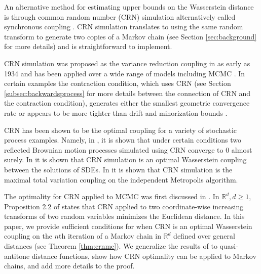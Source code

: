 \documentclass[12pt]{article}
\theoremstyle{plain}%
\theoremstyle{definition}
\begin{document}
An alternative method for estimating upper bounds on the Wasserstein distance is through common random number (CRN) simulation \cite{crn, jacob, sixtacrn} alternatively called synchronous coupling \cite{sdesynch,browniansynch, jacob}. CRN simulation translates to using the same random transform to generate two copies of a Markov chain (see Section \ref{sec:background} for more details) and is straightforward to implement. 

CRN simulation was proposed as the variance reduction coupling in as early as 1934 \cite{inequalities} and has been applied over a wide range of models including MCMC \cite{sixtacrn, biswas, crnconv}. In certain examples the contraction condition, which uses CRN (see Section \ref{subsec:backwardsprocess} for more details between the connection of CRN and the contraction condition), generates either the smallest geometric convergence rate \cite{oneshotnsphereexample, sixta,raj} or appears to be more tighter than drift and minorization bounds \cite{sixtacrn, jiangoneshotnsphereexample}.  



CRN has been shown to be the optimal coupling for a variety of stochastic process examples. Namely, in \cite{browniansynch}, it is shown that under certain conditions two reflected Brownian motion processes simulated using CRN converge to 0 almost surely. In \cite{sdesynch} it is shown that CRN simulation is an optimal Wasserstein coupling between the solutions of SDEs. In \cite{independentmetropolishastings} it is shown that CRN simulation is the maximal total variation coupling on the independent Metropolis algorithm.

The optimality for CRN applied to MCMC was first discussed in \cite{crn}.
In $\mathbb{R}^d, d\geq 1$, Proposition 2.2 of \cite{crn} states that CRN applied to two coordinate-wise increasing transforms of two random variables minimizes the Euclidean distance. In this paper, we provide sufficient conditions for when CRN is an optimal Wasserstein coupling on the $n$th iteration of a Markov chain in $\mathbb{R}^d$ defined over general distances (see Theorem \ref{thm:crnmc}).  We generalize the results of \cite{crn} to quasi-antitone distance functions, show how CRN optimality can be applied to Markov chains, and add more details to the proof. 
\end{document}
